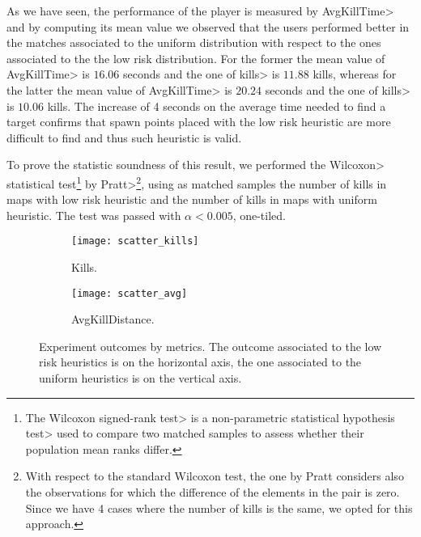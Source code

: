 \par

As we have seen, the performance of the player is measured by \<AvgKillTime> and by computing its mean value we observed that the users performed better in the matches associated to the uniform distribution with respect to the ones associated to the the low risk distribution. For the former the mean value of \<AvgKillTime> is $16.06$ seconds and the one of \<kills> is $11.88$ kills, whereas for the latter  the mean value of \<AvgKillTime> is $20.24$ seconds and the one of \<kills> is $10.06$ kills. The increase of 4 seconds on the average time needed to find a target confirms that spawn points placed with the low risk heuristic are more difficult to find and thus such heuristic is valid.

\par

To prove the statistic soundness of this result, we performed the \<Wilcoxon> statistical test\footnote{The \<Wilcoxon signed-rank test> is a \<non-parametric statistical hypothesis test> used to compare two matched samples to assess whether their population mean ranks differ.} by \<Pratt>\footnote{With respect to the standard Wilcoxon test, the one by Pratt considers also the observations for which the difference of the elements in the pair is zero. Since we have 4 cases where the number of kills is the same, we opted for this approach.}, using as matched samples the number of kills in maps with low risk heuristic and the number of kills in maps with uniform heuristic. The test was passed with $\alpha < 0.005$, one-tiled.

\begin{figure}[h]
 	\centering
  	\begin{subfigure}[t]{0.48\linewidth}
    		\texttt{[image: scatter\_kills]}
     		\caption{Kills.}
		\label{img:scatter_kills}
  	\end{subfigure}
  	\hfill
  	\begin{subfigure}[t]{0.48\linewidth}
    		\texttt{[image: scatter\_avg]}
     		\caption{AvgKillDistance.}
     		\label{img:scatter_avg}
  	\end{subfigure}
	\caption[Experiment outcomes by metrics.]{Experiment outcomes by metrics. The outcome associated to the low risk heuristics is on the horizontal axis, the one associated to the uniform heuristics is on the vertical axis.}
	\label{img:metrics}	
\end{figure}

